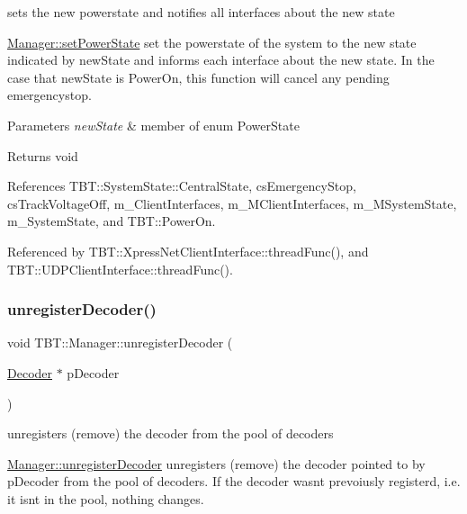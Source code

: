 sets the new powerstate and notifies all interfaces about the new state 

\hyperlink{classTBT_1_1Manager_a6e7616a839a1b48d89355bc740ed7793_a6e7616a839a1b48d89355bc740ed7793}{Manager\+::set\+Power\+State} set the powerstate of the system to the new state indicated by new\+State and informs each interface about the new state. In the case that new\+State is Power\+On, this function will cancel any pending emergencystop.


\begin{DoxyParams}{Parameters}
{\em new\+State} & member of enum Power\+State\\
\hline
\end{DoxyParams}
\begin{DoxyReturn}{Returns}
void 
\end{DoxyReturn}


References T\+B\+T\+::\+System\+State\+::\+Central\+State, cs\+Emergency\+Stop, cs\+Track\+Voltage\+Off, m\+\_\+\+Client\+Interfaces, m\+\_\+\+M\+Client\+Interfaces, m\+\_\+\+M\+System\+State, m\+\_\+\+System\+State, and T\+B\+T\+::\+Power\+On.



Referenced by T\+B\+T\+::\+Xpress\+Net\+Client\+Interface\+::thread\+Func(), and T\+B\+T\+::\+U\+D\+P\+Client\+Interface\+::thread\+Func().

\mbox{\label{classTBT_1_1Manager_a507ac74f4adfbb6173728bebe71e40e6_a507ac74f4adfbb6173728bebe71e40e6}} 
\subsubsection{\texorpdfstring{unregister\+Decoder()}{unregisterDecoder()}}
{\footnotesize\ttfamily void T\+B\+T\+::\+Manager\+::unregister\+Decoder (\begin{DoxyParamCaption}\item[{\hyperlink{classTBT_1_1Decoder}{Decoder} $\ast$}]{p\+Decoder }\end{DoxyParamCaption})}



unregisters (remove) the decoder from the pool of decoders 

\hyperlink{classTBT_1_1Manager_a507ac74f4adfbb6173728bebe71e40e6_a507ac74f4adfbb6173728bebe71e40e6}{Manager\+::unregister\+Decoder} unregisters (remove) the decoder pointed to by p\+Decoder from the pool of decoders. If the decoder wasn\textquotesingle{}t prevoiusly registerd, i.\+e. it isn\textquotesingle{}t in the pool, nothing changes.


